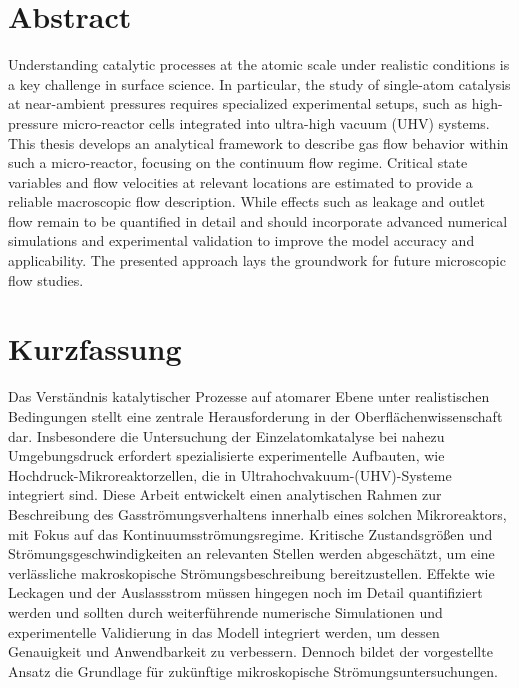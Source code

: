 \section*{Abstract}
Understanding catalytic processes at the atomic scale under realistic conditions is a key challenge in surface science.
In particular, the study of single-atom catalysis at near-ambient pressures requires specialized experimental setups, such as high-pressure micro-reactor cells integrated into ultra-high vacuum (UHV) systems.
This thesis develops an analytical framework to describe gas flow behavior within such a micro-reactor, focusing on the continuum flow regime.
Critical state variables and flow velocities at relevant locations are estimated to provide a reliable macroscopic flow description.
While effects such as leakage and outlet flow remain to be quantified in detail and should incorporate advanced numerical simulations and experimental validation to improve the model accuracy and applicability.
The presented approach lays the groundwork for future microscopic flow studies.
\blankpage

\section*{Kurzfassung}
Das Verständnis katalytischer Prozesse auf atomarer Ebene unter realistischen Bedingungen stellt eine zentrale Herausforderung in der Oberflächenwissenschaft dar.
Insbesondere die Untersuchung der Einzelatomkatalyse bei nahezu Umgebungsdruck erfordert spezialisierte experimentelle Aufbauten, wie Hochdruck-Mikroreaktorzellen, die in Ultrahochvakuum-(UHV)-Systeme integriert sind.
Diese Arbeit entwickelt einen analytischen Rahmen zur Beschreibung des Gasströmungsverhaltens innerhalb eines solchen Mikroreaktors, mit Fokus auf das Kontinuumsströmungsregime.
Kritische Zustandsgrößen und Strömungsgeschwindigkeiten an relevanten Stellen werden abgeschätzt, um eine verlässliche makroskopische Strömungsbeschreibung bereitzustellen.
Effekte wie Leckagen und der Auslassstrom müssen hingegen noch im Detail quantifiziert werden und sollten durch weiterführende numerische Simulationen und experimentelle Validierung in das Modell integriert werden, um dessen Genauigkeit und Anwendbarkeit zu verbessern.
Dennoch bildet der vorgestellte Ansatz die Grundlage für zukünftige mikroskopische Strömungsuntersuchungen.
\blankpage

